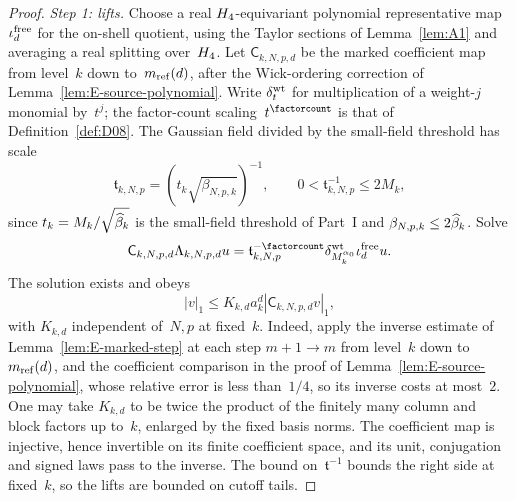 \begin{proof}
\emph{Step 1: lifts.} Choose a real $H_4$-equivariant polynomial representative map $\iota_d^{\rm free}$ for the on-shell quotient, using the Taylor sections of Lemma~\ref{lem:A1} and averaging a real splitting over~$H_4$. Let $\mathsf C_{k,N,p,d}$ be the marked coefficient map from level~$k$ down to~$m_{\mathrm{ref}}(d)$, after the Wick-ordering correction of Lemma~\ref{lem:E-source-polynomial}. Write $\delta_t^{\rm wt}$ for multiplication of a weight-$j$ monomial by~$t^j$; the factor-count scaling~$t^{\factorcount}$ is that of Definition~\ref{def:D08}. The Gaussian field divided by the small-field threshold has scale
\begin{equation*}
\mathfrak t_{k,N,p}=(t_k\sqrt{\beta_{N,p,k}})^{-1},\qquad
0<\mathfrak t_{k,N,p}^{-1}\le2M_k,
\end{equation*}
since $t_k=M_k/\sqrt{\widehat{\beta}_k}$ is the small-field threshold of Part~I and $\beta_{N,p,k}\le2\widehat{\beta}_k$. Solve
\begin{equation}\label{eq:G-lift-equation}
\mathsf C_{k,N,p,d}\Lambda_{k,N,p,d}u
=\mathfrak t_{k,N,p}^{-\factorcount}\delta_{M_k^{\alpha_0}}^{\rm wt}\iota_d^{\rm free}u.
\end{equation}
The solution exists and obeys
\begin{equation}\label{eq:G-lift-bound}
|v|_1\le K_{k,d}a_k^d|\mathsf C_{k,N,p,d}v|_1,
\end{equation}
with $K_{k,d}$ independent of~$N,p$ at fixed~$k$. Indeed, apply the inverse estimate of Lemma~\ref{lem:E-marked-step} at each step $m+1\to m$ from level~$k$ down to~$m_{\mathrm{ref}}(d)$, and the coefficient comparison in the proof of Lemma~\ref{lem:E-source-polynomial}, whose relative error is less than~$1/4$, so its inverse costs at most~$2$. One may take $K_{k,d}$ to be twice the product of the finitely many column and block factors up to~$k$, enlarged by the fixed basis norms. The coefficient map is injective, hence invertible on its finite coefficient space, and its unit, conjugation and signed laws pass to the inverse. The bound on~$\mathfrak t^{-1}$ bounds the right side at fixed~$k$, so the lifts are bounded on cutoff tails.


\end{proof}
